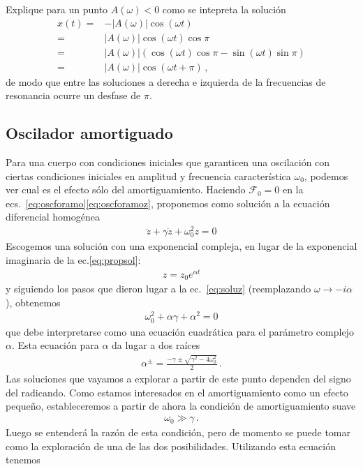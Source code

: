 \example{}
Explique para un punto $A(\omega)<0$ como se intepreta la solución
\begin{align}
  x(t)=&-|A(\omega)|\cos(\omega t)\nonumber\\
  =&|A(\omega)|\cos(\omega t)\cos\pi\nonumber\\
  =&|A(\omega)|\left(\cos(\omega t)\cos\pi-\sin(\omega t)\sin\pi  \right)\nonumber\\
  =&|A(\omega)|\cos(\omega t+\pi)\,,
\end{align}
de modo que entre las soluciones a derecha e izquierda de la frecuencias de resonancia ocurre un desfase de $\pi$.
\subsection{Oscilador amortiguado}
Para una cuerpo con condiciones iniciales que garanticen una oscilación con ciertas condiciones iniciales en amplitud y frecuencia característica $\omega_0$, podemos ver cual es el efecto sólo del amortiguamiento. Haciendo $\mathcal{F}_0=0$ en la ecs.~\eqref{eq:oscforamo}\eqref{eq:oscforamoz}, proponemos como solución a la ecuación diferencial homogénea
\begin{align*}
     \ddot z+\gamma \dot z+\omega_0^2 z=0
\end{align*}
Escogemos una solución con una exponencial compleja, en lugar de la exponencial imaginaria de la ec.\eqref{eq:propsol}:
\begin{align*}
  z=z_0 e^{\alpha t}
\end{align*}
y siguiendo los pasos que dieron lugar a la ec.~\eqref{eq:soluz} (reemplazando $\omega\to -i\alpha$), obtenemos
\begin{align*}
  \omega_0^2+\alpha \gamma+\alpha^2=0
\end{align*}
que debe interpretarse como una ecuación cuadrática para el parámetro complejo $\alpha$.
Esta ecuación para $\alpha$ da lugar a dos raíces
\begin{align*}
  \alpha^{\pm}=\frac{-\gamma\pm\sqrt{\gamma^2-4\omega_0^2}}{2}\,.
\end{align*}
Las soluciones que vayamos a explorar a partir de este punto dependen del signo del radicando. Como estamos interesados en el amortiguamiento como un efecto pequeño, estableceremos a partir de ahora la condición de amortiguamiento suave
\begin{align}
  \label{eq:12}
  \omega_0\gg \gamma\,.
\end{align}
Luego se entenderá la razón de esta condición, pero de momento se puede tomar como la exploración de una de las dos posibilidades. Utilizando esta ecuación tenemos
